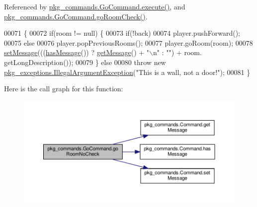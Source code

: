 Referenced by \hyperlink{GoCommand_8java_source_l00032}{pkg\-\_\-commands.\-Go\-Command.\-execute()}, and \hyperlink{GoCommand_8java_source_l00056}{pkg\-\_\-commands.\-Go\-Command.\-go\-Room\-Check()}.


\begin{DoxyCode}
00071                                                                                                            
                   \{
00072         \textcolor{keywordflow}{if}(room != null) \{
00073             \textcolor{keywordflow}{if}(!back)
00074                 player.pushForward();
00075             \textcolor{keywordflow}{else}
00076                 player.popPreviousRooms();
00077             player.goRoom(room);
00078             \hyperlink{classpkg__commands_1_1Command_ae210ff216fe908b111ba1c988a963d13}{setMessage}(((\hyperlink{classpkg__commands_1_1Command_ae46bb048d0fa705a5037a5204b530da2}{hasMessage}()) ? \hyperlink{classpkg__commands_1_1Command_ac2a42e2bab264821892daefaf9a18b6c}{getMessage}() + \textcolor{stringliteral}{"\(\backslash\)n"} : \textcolor{stringliteral}{""}) + room.
      getLongDescription());
00079         \} \textcolor{keywordflow}{else}
00080             \textcolor{keywordflow}{throw} \textcolor{keyword}{new} \hyperlink{classpkg__exceptions_1_1IllegalArgumentException}{pkg\_exceptions.IllegalArgumentException}(\textcolor{stringliteral}{"This
       is a wall, not a door!"});
00081     \}
\end{DoxyCode}


Here is the call graph for this function\-:\nopagebreak
\begin{figure}[H]
\begin{center}
\leavevmode
\includegraphics[width=350pt]{classpkg__commands_1_1GoCommand_a210afbc5f3ef34d3ad5759d853c8f8c2_cgraph}
\end{center}
\end{figure}




